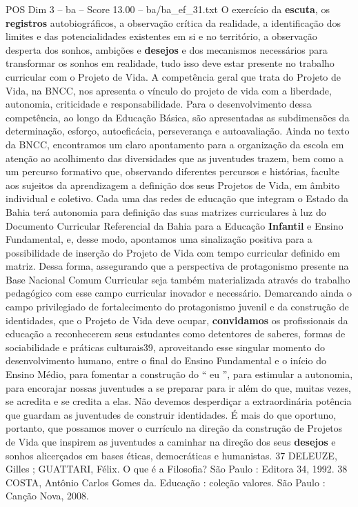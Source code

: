 \begin{textsample}{POS Dim 3 – ba – Score 13.00 – ba/ba\_ef\_31.txt}
O exercício da \textbf{escuta}, os \textbf{registros} autobiográficos, a observação crítica da realidade, a identificação dos limites e das potencialidades existentes em si e no território, a observação desperta dos sonhos, ambições e \textbf{desejos} e dos mecanismos necessários para transformar os sonhos em realidade, tudo isso deve estar presente no trabalho curricular com o Projeto de Vida.
A competência geral que trata do Projeto de Vida, na BNCC, nos apresenta o vínculo do projeto de vida com a liberdade, autonomia, criticidade e responsabilidade.
Para o desenvolvimento dessa competência, ao longo da Educação Básica, são apresentadas as subdimensões da determinação, esforço, autoeficácia, perseverança e autoavaliação.
Ainda no texto da BNCC, encontramos um claro apontamento para a organização da escola em atenção ao acolhimento das diversidades que as juventudes trazem, bem como a um percurso formativo que, observando diferentes percursos e histórias, faculte aos sujeitos da aprendizagem a definição dos seus Projetos de Vida, em âmbito individual e coletivo.
Cada uma das redes de educação que integram o Estado da Bahia terá autonomia para definição das suas matrizes curriculares à luz do Documento Curricular Referencial da Bahia para a Educação \textbf{Infantil} e Ensino Fundamental, e, desse modo, apontamos uma sinalização positiva para a possibilidade de inserção do Projeto de Vida com tempo curricular definido em matriz.
Dessa forma, assegurando que a perspectiva de protagonismo presente na Base Nacional Comum Curricular seja também materializada através do trabalho pedagógico com esse campo curricular inovador e necessário.
Demarcando ainda o campo privilegiado de fortalecimento do protagonismo juvenil e da construção de identidades, que o Projeto de Vida deve ocupar, \textbf{convidamos} os profissionais da educação a reconhecerem seus estudantes como detentores de saberes, formas de sociabilidade e práticas culturais39, aproveitando esse singular momento do desenvolvimento humano, entre o final do Ensino Fundamental e o início do Ensino Médio, para fomentar a construção do “ eu ”, para estimular a autonomia, para encorajar nossas juventudes a se preparar para ir além do que, muitas vezes, se acredita e se credita a elas.
Não devemos desperdiçar a extraordinária potência que guardam as juventudes de construir identidades.
É mais do que oportuno, portanto, que possamos mover o currículo na direção da construção de Projetos de Vida que inspirem as juventudes a caminhar na direção dos seus \textbf{desejos} e sonhos alicerçados em bases éticas, democráticas e humanistas. 37 DELEUZE, Gilles ; GUATTARI, Félix.
O que é a Filosofia?
São Paulo : Editora 34, 1992. 38 COSTA, Antônio Carlos Gomes da.
Educação : coleção valores.
São Paulo : Canção Nova, 2008.

\end{textsample}
